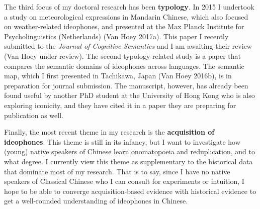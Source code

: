 \documentclass[12pt,]{article}
\theoremstyle{definition}
\theoremstyle{definition}
\theoremstyle{definition}
\theoremstyle{remark}
\begin{document}
The third focus of my doctoral research has been \textbf{typology}. In
2015 I undertook a study on meteorological expressions in Mandarin
Chinese, which also focused on weather-related ideophones, and presented
at the Max Planck Institute for Psycholinguistics (Netherlands) (Van
Hoey 2017a). This paper I recently submitted to the \emph{Journal of
Cognitive Semantics} and I am awaiting their review (Van Hoey under
review). The second typology-related study is a paper that compares the
semantic domains of ideophones across languages. The semantic map, which
I first presented in Tachikawa, Japan (Van Hoey 2016b), is in
preparation for journal submission. The manuscript, however, has already
been found useful by another PhD student at the University of Hong Kong
who is also exploring iconicity, and they have cited it in a paper they
are preparing for publication as well.

Finally, the most recent theme in my research is the \textbf{acquisition
of ideophones}. This theme is still in its infancy, but I want to
investigate how (young) native speakers of Chinese learn onomatopoeia
and reduplication, and to what degree. I currently view this theme as
supplementary to the historical data that dominate most of my research.
That is to say, since I have no native speakers of Classical Chinese who
I can consult for experiments or intuition, I hope to be able to
converge acquisition-based evidence with historical evidence to get a
well-rounded understanding of ideophones in Chinese.
\end{document}

